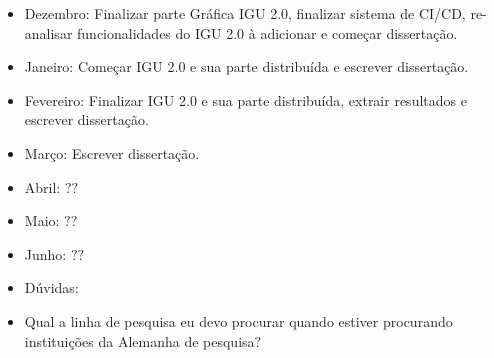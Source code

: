 \documentclass[10pt]{beamer}
\theoremstyle{remark}
\theoremstyle{definition}
\begin{document}
\begin{frame}[allowframebreaks]
\begin{itemize}
		\item Dezembro: Finalizar parte Gráfica IGU 2.0, finalizar sistema de CI/CD, re-analisar funcionalidades do IGU 2.0 à adicionar e começar dissertação.
		
		\item Janeiro: Começar IGU 2.0 e sua parte distribuída e escrever dissertação.
		
		\item Fevereiro: Finalizar IGU 2.0 e sua parte distribuída, extrair resultados e escrever dissertação.
		
		\item Março: Escrever dissertação.
		
		\item Abril: $??$
		
		\item Maio: $??$
		
		\item Junho: $??$
		
	\end{itemize}
	
	
	\framebreak
	
	\begin{itemize}
	\item Dúvidas:
	
	\item Qual a linha de pesquisa eu devo procurar quando estiver procurando instituições da Alemanha de pesquisa$?$
	
	\end{itemize}
	
\end{frame}
\end{document}
